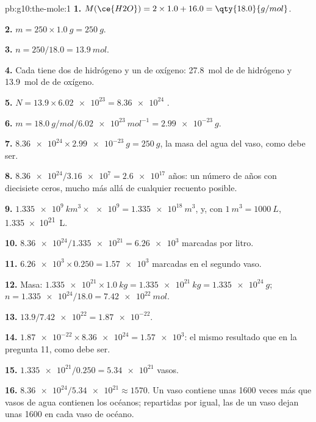 \begin{solution}{pb:g10:the-mole:1}
\textbf{1.} $M(\ce{H2O}) = 2 \times 1.0 + 16.0 = \qty{18.0}{g/mol}$.

\textbf{2.} $m = 250 \times \qty{1.0}{g} = \qty{250}{g}$.

\textbf{3.} $n = 250 / 18.0 = \qty{13.9}{mol}$.

\textbf{4.} Cada  tiene dos  de hidrógeno y un  de
oxígeno: \qty{27.8}{mol} de  de hidrógeno y \qty{13.9}{mol} de
 de oxígeno.

\textbf{5.} $N = 13.9 \times \num{6.02e23} = \num{8.36e24}$ .

\textbf{6.} $m = \qty{18.0}{g/mol} / \qty{6.02e23}{mol^{-1}} =
\qty{2.99e-23}{g}$.

\textbf{7.} $\num{8.36e24} \times \qty{2.99e-23}{g} = \qty{250}{g}$, la
masa del agua del vaso, como debe ser.

\textbf{8.} $\num{8.36e24} / \num{3.16e7} = \num{2.6e17}$ años: un
número de años con diecisiete ceros, mucho más allá de cualquier
recuento posible.

\textbf{9.} $\qty{1.335e9}{km^3} \times \num{e9} = \qty{1.335e18}{m^3}$,
y, con $\qty{1}{m^3} = \qty{1000}{L}$, \qty{1.335e21}{L}.

\textbf{10.} $\num{8.36e24} / \num{1.335e21} = \num{6.26e3}$ 
marcadas por litro.

\textbf{11.} $\num{6.26e3} \times 0.250 = \num{1.57e3}$ 
marcadas en el segundo vaso.

\textbf{12.} Masa: $\num{1.335e21} \times \qty{1.0}{kg} =
\qty{1.335e21}{kg} = \qty{1.335e24}{g}$; $n = \num{1.335e24} / 18.0 =
\qty{7.42e22}{mol}$.

\textbf{13.} $13.9 / \num{7.42e22} = \num{1.87e-22}$.

\textbf{14.} $\num{1.87e-22} \times \num{8.36e24} = \num{1.57e3}$: el
mismo resultado que en la pregunta 11, como debe ser.

\textbf{15.} $\num{1.335e21} / 0.250 = \num{5.34e21}$ vasos.

\textbf{16.} $\num{8.36e24} / \num{5.34e21} \approx 1570$. Un vaso
contiene unas 1600 veces más  que vasos de agua contienen los
océanos; repartidas por igual, las  de un vaso dejan unas 1600
en cada vaso de océano.


\end{solution}
